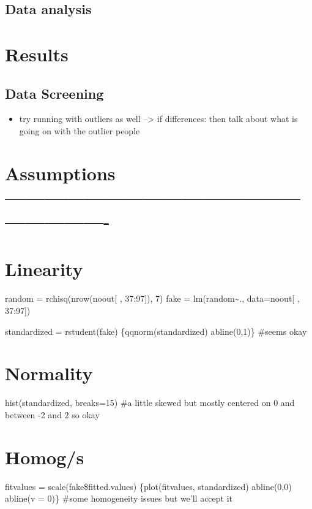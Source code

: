 \documentclass[
  man]{apa6}
\providecommand{\tightlist}{%
  \setlength{\itemsep}{0pt}\setlength{\parskip}{0pt}}
\begin{document}
\subsection{Data analysis}\label{data-analysis}

\section{Results}\label{results}

\subsection{Data Screening}\label{data-screening}

\begin{itemize}
\tightlist
\item
  try running with outliers as well --\textgreater{} if differences: then talk
  about what is going on with the outlier people
\end{itemize}

\section{Assumptions -------------------------------------------------------------}\label{assumptions--}

\section{Linearity}\label{linearity}

random = rchisq(nrow(noout{[} , 37:97{]}), 7) fake = lm(random\textasciitilde.,
data=noout{[} , 37:97{]})

standardized = rstudent(fake) \{qqnorm(standardized) abline(0,1)\} \#seems
okay

\section{Normality}\label{normality}

hist(standardized, breaks=15) \#a little skewed but mostly centered on 0
and between -2 and 2 so okay

\section{Homog/s}\label{homogs}

fitvalues = scale(fake\$fitted.values) \{plot(fitvalues, standardized)
abline(0,0) abline(v = 0)\} \#some homogeneity issues but we'll accept it
\end{document}
